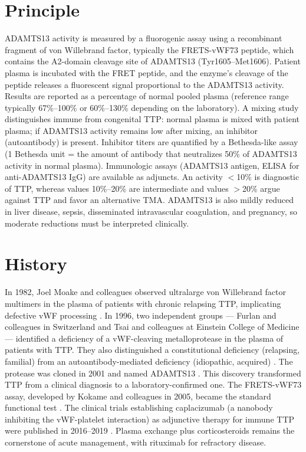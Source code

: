 \section*{Principle}
ADAMTS13 activity is measured by a fluorogenic assay using a recombinant fragment of von Willebrand factor, typically the FRETS-vWF73 peptide, which contains the A2-domain cleavage site of ADAMTS13 (Tyr1605--Met1606). Patient plasma is incubated with the FRET peptide, and the enzyme's cleavage of the peptide releases a fluorescent signal proportional to the ADAMTS13 activity. Results are reported as a percentage of normal pooled plasma (reference range typically 67\%--100\% or 60\%--130\% depending on the laboratory). A mixing study distinguishes immune from congenital TTP: normal plasma is mixed with patient plasma; if ADAMTS13 activity remains low after mixing, an inhibitor (autoantibody) is present. Inhibitor titers are quantified by a Bethesda-like assay (1 Bethesda unit = the amount of antibody that neutralizes 50\% of ADAMTS13 activity in normal plasma). Immunologic assays (ADAMTS13 antigen, ELISA for anti-ADAMTS13 IgG) are available as adjuncts. An activity $<$10\% is diagnostic of TTP, whereas values 10\%--20\% are intermediate and values $>$20\% argue against TTP and favor an alternative TMA. ADAMTS13 is also mildly reduced in liver disease, sepsis, disseminated intravascular coagulation, and pregnancy, so moderate reductions must be interpreted clinically.

\section*{History}
In 1982, Joel Moake and colleagues observed ultralarge von Willebrand factor multimers in the plasma of patients with chronic relapsing TTP, implicating defective vWF processing \cite{moake1982unusually}. In 1996, two independent groups --- Furlan and colleagues in Switzerland and Tsai and colleagues at Einstein College of Medicine --- identified a deficiency of a vWF-cleaving metalloprotease in the plasma of patients with TTP. They also distinguished a constitutional deficiency (relapsing, familial) from an autoantibody-mediated deficiency (idiopathic, acquired) \cite{furlan1997deficient, tsai1998antibodies}. The protease was cloned in 2001 and named ADAMTS13 \cite{levy2001mutations}. This discovery transformed TTP from a clinical diagnosis to a laboratory-confirmed one. The FRETS-vWF73 assay, developed by Kokame and colleagues in 2005, became the standard functional test \cite{kokame2005frets}. The clinical trials establishing caplacizumab (a nanobody inhibiting the vWF-platelet interaction) as adjunctive therapy for immune TTP were published in 2016--2019 \cite{scully2019caplacizumab}. Plasma exchange plus corticosteroids remains the cornerstone of acute management, with rituximab for refractory disease.

